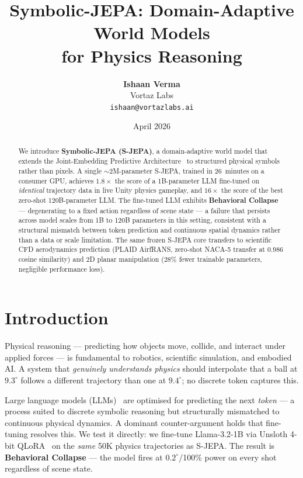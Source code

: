 \documentclass[10pt,twocolumn]{article}
\title{\textbf{Symbolic-JEPA: Domain-Adaptive World Models\\for Physics Reasoning}}
\author{
  \textbf{Ishaan Verma}\\
  Vortaz Labs\\
  \texttt{ishaan@vortazlabs.ai}
}
\date{April 2026}
\begin{document}
\maketitle

\begin{abstract}
We introduce \textbf{Symbolic-JEPA (S-JEPA)}, a domain-adaptive world model that extends
the Joint-Embedding Predictive Architecture~\citep{lecun2022path,assran2023ijepa} to
structured physical symbols rather than pixels. A single ${\sim}2$M-parameter S-JEPA,
trained in 26~minutes on a consumer GPU, achieves $1.8\times$ the score of a
1B-parameter LLM fine-tuned on \emph{identical} trajectory data in live Unity physics gameplay,
and $16\times$ the score of the best zero-shot 120B-parameter LLM.
The fine-tuned LLM exhibits \textbf{Behavioral Collapse} — degenerating to a fixed action
regardless of scene state — a failure that persists across model scales from 1B to 120B
parameters in this setting, consistent with a structural mismatch between token prediction
and continuous spatial dynamics rather than a data or scale limitation.
The same frozen S-JEPA core transfers to scientific CFD aerodynamics prediction
(PLAID AirfRANS, zero-shot NACA-5 transfer at $0.986$ cosine similarity)
and 2D planar manipulation (28\% fewer trainable parameters, negligible performance loss).
\end{abstract}

\section{Introduction}
\label{sec:intro}

Physical reasoning — predicting how objects move, collide, and interact under applied forces
— is fundamental to robotics, scientific simulation, and embodied AI. A system that
\emph{genuinely understands physics} should interpolate that a ball at $9.3^\circ$ follows a
different trajectory than one at $9.4^\circ$; no discrete token captures this.

Large language models (LLMs)~\citep{brown2020gpt3,touvron2023llama2} are optimised for
predicting the next \emph{token} — a process suited to discrete symbolic reasoning but
structurally mismatched to continuous physical dynamics. A dominant counter-argument holds
that fine-tuning resolves this. We test it directly: we fine-tune Llama-3.2-1B via Unsloth
4-bit QLoRA~\citep{dettmers2023qlora} on the \emph{same} 50K physics trajectories as
S-JEPA. The result is \textbf{Behavioral Collapse} — the model fires at $0.2^\circ$/100\%
power on every shot regardless of scene state.
\end{document}
